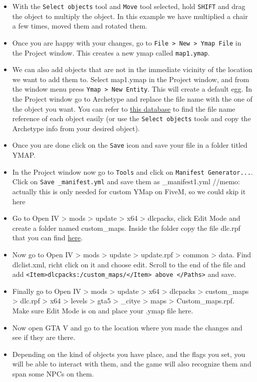 \documentclass[
  openany]{book}
\begin{document}
\begin{itemize}
\item
  With the \texttt{Select\ objects} tool and \texttt{Move} tool selected, hold \texttt{SHIFT} and drag the object to multiply the object. In this example we have multiplied a chair a few times, moved them and rotated them.
\item
  Once you are happy with your changes, go to \texttt{File\ \textgreater{}\ New\ \textgreater{}\ Ymap\ File} in the Project window. This creates a new ymap called \texttt{map1.ymap}.
\item
  We can also add objects that are not in the immediate vicinity of the location we want to add them to. Select map1.ymap in the Project window, and from the window menu press \texttt{Ymap\ \textgreater{}\ New\ Entity}. This will create a default egg. In the Project window go to Archetype and replace the file name with the one of the object you want. You can refer to \href{https://gta-objects.xyz/}{this database} to find the file name reference of each object easily (or use the \texttt{Select\ objects} tools and copy the Archetype info from your desired object).
\item
  Once you are done click on the \texttt{Save} icon and save your file in a folder titled YMAP.
\item
  In the Project window now go to \texttt{Tools} and click on \texttt{Manifest\ Generator...}. Click on \texttt{Save\ \_manifest.yml} and save them as \_manifest1.yml //memo: actually this is only needed for custom YMap on FiveM, so we could skip it here
\item
  Go to Open IV \textgreater{} mods \textgreater{} update \textgreater{} x64 \textgreater{} dlcpacks, click Edit Mode and create a folder named custom\_maps. Inside the folder copy the file dlc.rpf that you can find \href{https://github.com/marcodemutiis/the-photographers-guide-to-los-santos/blob/main/assets/custom_maps/dlc.rpf}{here}.
\item
  Now go to Open IV \textgreater{} mods \textgreater{} update \textgreater{} update.rpf \textgreater{} common \textgreater{} data. Find dlclist.xml, richt click on it and choose edit. Scroll to the end of the file and add \texttt{\textless{}Item\textgreater{}dlcpacks:/custom\_maps/\textless{}/Item\textgreater{}\ above\ \textless{}/Paths\textgreater{}} and save.
\item
  Finally go to Open IV \textgreater{} mods \textgreater{} update \textgreater{} x64 \textgreater{} dlcpacks \textgreater{} custom\_maps \textgreater{} dlc.rpf \textgreater{} x64 \textgreater{} levels \textgreater{} gta5 \textgreater{} \_citye \textgreater{} maps \textgreater{} Custom\_maps.rpf. Make sure Edit Mode is on and place your .ymap file here.
\item
  Now open GTA V and go to the location where you made the changes and see if they are there.
\item
  Depending on the kind of objects you have place, and the flags you set, you will be able to interact with them, and the game will also recognize them and span some NPCs on them.
\end{itemize}
\end{document}

